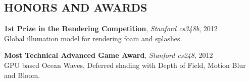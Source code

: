 \documentclass{res}
\begin{document}
\begin{resume}
\section{HONORS AND AWARDS}
{\bf1st Prize in the Rendering Competition}, \emph{Stanford cs348b}, 2012\\
Global illumation model for rendering foam and splashes.

{\bf Most Technical Advanced Game Award}, \emph{Stanford cs248}, 2012\\
GPU based Ocean Waves, Deferred shading with Depth of
Field, Motion Blur and Bloom.

\end{resume}
\end{document}
